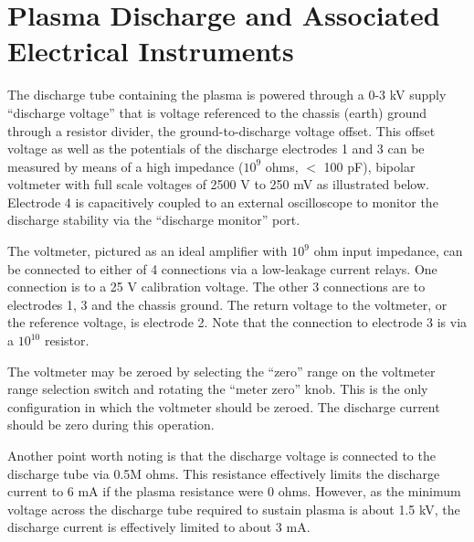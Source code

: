 \documentclass{../lab}
\begin{document}


\section{Plasma Discharge and Associated Electrical Instruments}

The discharge tube containing the plasma is powered through a 0-3 kV supply ``discharge voltage'' that is voltage referenced to the chassis (earth) ground through a resistor divider, the ground-to-discharge voltage offset. This offset voltage as well as the potentials of the discharge electrodes 1 and 3 can be measured by means of a high impedance ($10^9$ ohms, $<$ 100 pF), bipolar voltmeter with full scale voltages of 2500 V to 250 mV as illustrated below. Electrode 4 is capacitively coupled to an external oscilloscope to monitor the discharge stability via the ``discharge monitor'' port.

The voltmeter, pictured as an ideal amplifier with $10^9$ ohm input impedance, can be connected to either of 4 connections via a low-leakage current relays. One connection is to a 25 V calibration voltage. The other 3 connections are to electrodes 1, 3 and the chassis ground. The return voltage to the voltmeter, or the reference voltage, is electrode 2. Note that the connection to electrode 3 is via a $10^{10}$ resistor.

The voltmeter may be zeroed by selecting the ``zero'' range on the voltmeter range selection switch and rotating the ``meter zero'' knob. This is the only configuration in which the voltmeter should be zeroed. The discharge current should be zero during this operation.

Another point worth noting is that the discharge voltage is connected to the discharge tube via 0.5M ohms. This resistance effectively limits the discharge current to 6 mA if the plasma resistance were 0 ohms. However, as the minimum voltage across the discharge tube required to sustain plasma is about 1.5 kV, the discharge current is effectively limited to about 3 mA.
\end{document}
